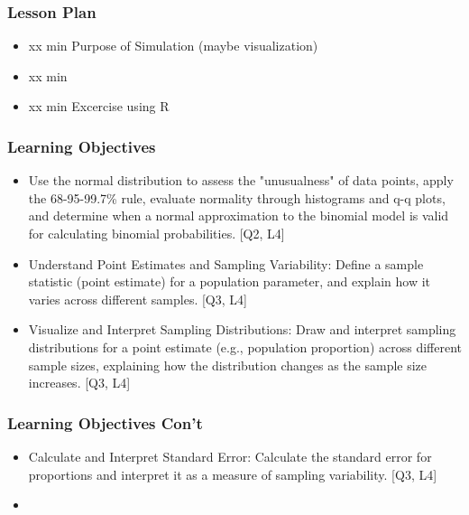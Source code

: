 

\begin{frame}
\frametitle{Lesson Plan}
\begin{itemize}
    \item xx min Purpose of Simulation (maybe visualization)
    \item xx min 
    \item xx min Excercise using R 
\end{itemize}
\end{frame}


\begin{frame}
\frametitle{Learning Objectives}

\begin{itemize}
    \item Use the normal distribution to assess the "unusualness" of data points, apply the 68-95-99.7\% rule, evaluate normality through histograms and q-q plots, and determine when a normal approximation to the binomial model is valid for calculating binomial probabilities. [Q2, L4] 
    \item Understand Point Estimates and Sampling Variability: Define a sample statistic (point estimate) for a population parameter, and explain how it varies across different samples. [Q3, L4] 
    \item Visualize and Interpret Sampling Distributions: Draw and interpret sampling distributions for a point estimate (e.g., population proportion) across different sample sizes, explaining how the distribution changes as the sample size increases. [Q3, L4] 
\end{itemize}
\end{frame}


\begin{frame}
    \frametitle{Learning Objectives Con't}

    \begin{itemize}
        \item Calculate and Interpret Standard Error: Calculate the standard error for proportions and interpret it as a measure of sampling variability. [Q3, L4]
        \item   

    \end{itemize}
\end{frame}






